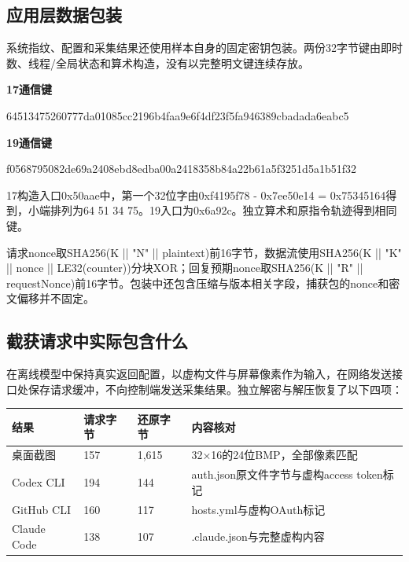 \documentclass[UTF8,a4paper,zihao=5,fontset=windows]{ctexart}
\newcommand{\code}[1]{{\ttfamily\small #1}}
\begin{document}
\subsection{应用层数据包装}
系统指纹、配置和采集结果还使用样本自身的固定密钥包装。两份32字节键由即时数、线程/全局状态和算术构造，没有以完整明文键连续存放。
\begin{tcolorbox}\noindent\textbf{17通信键}\par \code{64513475\allowbreak{}260777da\allowbreak{}01085cc2\allowbreak{}196b4faa\allowbreak{}9e6f4df2\allowbreak{}3f5fa946\allowbreak{}389cbada\allowbreak{}da6eabc5}\par\medskip\noindent\textbf{19通信键}\par \code{f0568795\allowbreak{}082de69a\allowbreak{}2408ebd8\allowbreak{}edba00a2\allowbreak{}418358b8\allowbreak{}4a22b61a\allowbreak{}5f3251d5\allowbreak{}a1b51f32}\end{tcolorbox}

17构造入口\code{0x50aae}中，第一个32位字由\code{0xf4195f78 - 0x7ee50e14 = 0x75345164}得到，小端排列为\code{64 51 34 75}。19入口为\code{0x6a92c}。独立算术和原指令轨迹得到相同键。

请求nonce取\code{SHA256(K || "N" || plaintext)}前16字节，数据流使用\code{SHA256(K || "K" || nonce || LE32(counter))}分块XOR；回复预期nonce取\code{SHA256(K || "R" || requestNonce)}前16字节。包装中还包含压缩与版本相关字段，捕获包的nonce和密文偏移并不固定。

\subsection{截获请求中实际包含什么}
在离线模型中保持真实返回配置，以虚构文件与屏幕像素作为输入，在网络发送接口处保存请求缓冲，不向控制端发送采集结果。独立解密与解压恢复了以下四项：
\par\medskip\noindent\begin{tabularx}{\linewidth}{@{}L{34mm}L{25mm}L{25mm}Y@{}}\toprule 结果 & 请求字节 & 还原字节 & 内容核对\\\midrule
桌面截图 & 157 & 1,615 & 32×16的24位BMP，全部像素匹配\\
Codex CLI & 194 & 144 & \code{auth.json}原文件字节与虚构access token标记\\
GitHub CLI & 160 & 117 & \code{hosts.yml}与虚构OAuth标记\\
Claude Code & 138 & 107 & \code{.claude.json}与完整虚构内容\\\bottomrule\end{tabularx}\par\medskip
\end{document}
